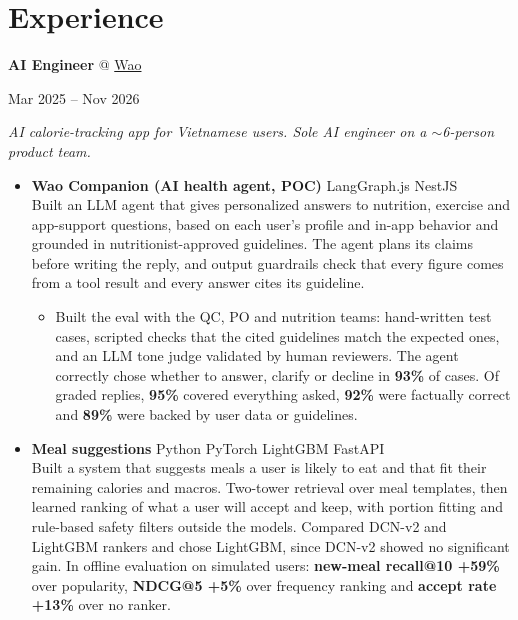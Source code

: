 \documentclass[10pt, a4paper]{article}
\newcommand{\stacktag}[1]{{\setlength{\fboxsep}{1 pt}\colorbox{tagColor}{\fontsize{7.6 pt}{9 pt}\selectfont\color{primaryColor}#1}}}
\newenvironment{highlights}{
    \begin{itemize}[
        topsep=1.5 pt,
        parsep=0pt,
        partopsep=0pt,
        itemsep=1.5 pt,
        leftmargin=12 pt
    ]
}{
    \end{itemize}
} %
\newenvironment{twocolentry}[2][]{
    \def\secondColumn{#2}
    \par
}{
    \unskip\hfill\secondColumn\par
} %
\begin{document}
    \section{Experience}
        \begin{twocolentry}{Mar 2025 -- Nov 2026}
            \textbf{AI Engineer} @ \href{https://apps.apple.com/vn/app/wao-food-calorie-counter/id6737834587}{Wao}
        \end{twocolentry}
        \textit{AI calorie-tracking app for Vietnamese users. Sole AI engineer on a $\sim$6-person product team.}
        \begin{highlights}
            \item \textbf{Wao Companion (AI health agent, POC)} \stacktag{LangGraph.js} \stacktag{NestJS}\\
            Built an LLM agent that gives personalized answers to nutrition, exercise and app-support questions, based on each user's profile and in-app behavior and grounded in nutritionist-approved guidelines. The agent plans its claims before writing the reply, and output guardrails check that every figure comes from a tool result and every answer cites its guideline.
            \begin{highlights}
                \item Built the eval with the QC, PO and nutrition teams: hand-written test cases, scripted checks that the cited guidelines match the expected ones, and an LLM tone judge validated by human reviewers. The agent correctly chose whether to answer, clarify or decline in \textbf{93\%} of cases. Of graded replies, \textbf{95\%} covered everything asked, \textbf{92\%} were factually correct and \textbf{89\%} were backed by user data or guidelines.
            \end{highlights}
            \item \textbf{Meal suggestions} \stacktag{Python} \stacktag{PyTorch} \stacktag{LightGBM} \stacktag{FastAPI}\\
            Built a system that suggests meals a user is likely to eat and that fit their remaining calories and macros. Two-tower retrieval over meal templates, then learned ranking of what a user will accept and keep, with portion fitting and rule-based safety filters outside the models. Compared DCN-v2 and LightGBM rankers and chose LightGBM, since DCN-v2 showed no significant gain. In offline evaluation on simulated users: \textbf{new-meal recall@10 +59\%} over popularity, \textbf{NDCG@5 +5\%} over frequency ranking and \textbf{accept rate +13\%} over no ranker.

\end{highlights}
\end{document}
